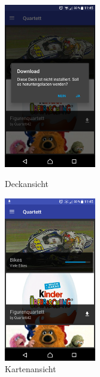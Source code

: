 \documentclass{scrartcl}
\begin{document}
\begin{figure}
  \centering
  \begin{minipage}{0.45\textwidth}
    \centering
    \includegraphics[width=4cm]{img/gallery_dialog.png}
    \caption{Deckansicht}
  \end{minipage}
  \hfill
  \begin{minipage}{0.45\textwidth}
    \centering
    \includegraphics[width=4cm]{img/gallery_download.png}
    \caption{Kartenansicht}
  \end{minipage}
\end{figure}
\end{document}
